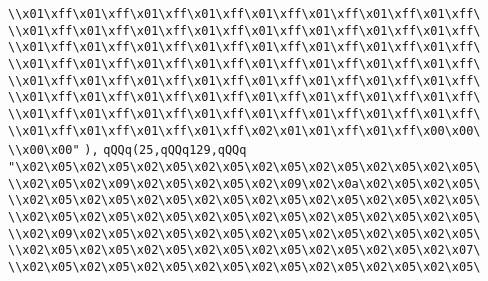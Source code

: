 \verb|\\x01\xff\x01\xff\x01\xff\x01\xff\x01\xff\x01\xff\x01\xff\x01\xff\|\newline
\verb|\\x01\xff\x01\xff\x01\xff\x01\xff\x01\xff\x01\xff\x01\xff\x01\xff\|\newline
\verb|\\x01\xff\x01\xff\x01\xff\x01\xff\x01\xff\x01\xff\x01\xff\x01\xff\|\newline
\verb|\\x01\xff\x01\xff\x01\xff\x01\xff\x01\xff\x01\xff\x01\xff\x01\xff\|\newline
\verb|\\x01\xff\x01\xff\x01\xff\x01\xff\x01\xff\x01\xff\x01\xff\x01\xff\|\newline
\verb|\\x01\xff\x01\xff\x01\xff\x01\xff\x01\xff\x01\xff\x01\xff\x01\xff\|\newline
\verb|\\x01\xff\x01\xff\x01\xff\x01\xff\x01\xff\x01\xff\x01\xff\x01\xff\|\newline
\verb|\\x01\xff\x01\xff\x01\xff\x01\xff\x02\x01\x01\xff\x01\xff\x00\x00\|\newline
\verb|\\x00\x00"|\newline
\verb|),|\newline
\verb|qQQq(25,qQQq129,qQQq|\newline
\verb|"\x02\x05\x02\x05\x02\x05\x02\x05\x02\x05\x02\x05\x02\x05\x02\x05\|\newline
\verb|\\x02\x05\x02\x09\x02\x05\x02\x05\x02\x09\x02\x0a\x02\x05\x02\x05\|\newline
\verb|\\x02\x05\x02\x05\x02\x05\x02\x05\x02\x05\x02\x05\x02\x05\x02\x05\|\newline
\verb|\\x02\x05\x02\x05\x02\x05\x02\x05\x02\x05\x02\x05\x02\x05\x02\x05\|\newline
\verb|\\x02\x09\x02\x05\x02\x05\x02\x05\x02\x05\x02\x05\x02\x05\x02\x05\|\newline
\verb|\\x02\x05\x02\x05\x02\x05\x02\x05\x02\x05\x02\x05\x02\x05\x02\x07\|\newline
\verb|\\x02\x05\x02\x05\x02\x05\x02\x05\x02\x05\x02\x05\x02\x05\x02\x05\|\newline

